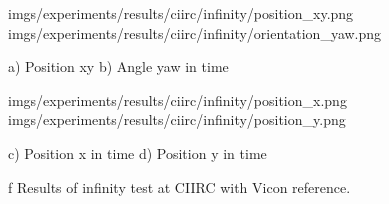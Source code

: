 \midinsert
\centerline {\picw=8cm \inspic imgs/experiments/results/ciirc/infinity/position_xy.png \hfil\hfil \picw=8cm \inspic imgs/experiments/results/ciirc/infinity/orientation_yaw.png }\nobreak
\centerline {a) Position xy \hfil\hfil b) Angle yaw in time}\nobreak\medskip
\centerline {\picw=8cm \inspic imgs/experiments/results/ciirc/infinity/position_x.png \hfil\hfil \picw=8cm \inspic imgs/experiments/results/ciirc/infinity/position_y.png }\nobreak
\centerline {c) Position x in time \hfil\hfil d) Position y in time}\nobreak\medskip
{}
\caption/f Results of infinity test at CIIRC with Vicon reference.
\endinsert


